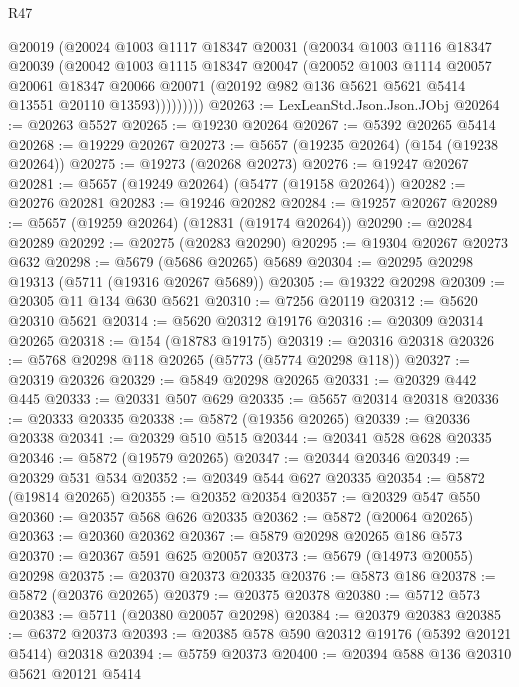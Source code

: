 \begin{lexlean}{R47}
\begin{coremodule}
            @20019
            (@20024
              @1003
              @1117
              @18347
              @20031
              (@20034
                @1003
                @1116
                @18347
                @20039
                (@20042
                  @1003
                  @1115
                  @18347
                  @20047
                  (@20052
                    @1003
                    @1114
                    @20057
                    @20061
                    @18347
                    @20066
                    @20071
                    (@20192 @982 @136 @5621 @5621 @5414 @13551 @20110 @13593)))))))))
@20263 := LexLeanStd.Json.Json.JObj
@20264 := @20263 @5527
@20265 := @19230 @20264
@20267 := @5392 @20265 @5414
@20268 := @19229 @20267
@20273 := @5657 (@19235 @20264) (@154 (@19238 @20264))
@20275 := @19273 (@20268 @20273)
@20276 := @19247 @20267
@20281 := @5657 (@19249 @20264) (@5477 (@19158 @20264))
@20282 := @20276 @20281
@20283 := @19246 @20282
@20284 := @19257 @20267
@20289 := @5657 (@19259 @20264) (@12831 (@19174 @20264))
@20290 := @20284 @20289
@20292 := @20275 (@20283 @20290)
@20295 := @19304 @20267 @20273 @632
@20298 := @5679 (@5686 @20265) @5689
@20304 := @20295 @20298 @19313 (@5711 (@19316 @20267 @5689))
@20305 := @19322 @20298
@20309 := @20305 @11 @134 @630 @5621
@20310 := @7256 @20119
@20312 := @5620 @20310 @5621
@20314 := @5620 @20312 @19176
@20316 := @20309 @20314 @20265
@20318 := @154 (@18783 @19175)
@20319 := @20316 @20318
@20326 := @5768 @20298 @118 @20265 (@5773 (@5774 @20298 @118))
@20327 := @20319 @20326
@20329 := @5849 @20298 @20265
@20331 := @20329 @442 @445
@20333 := @20331 @507 @629
@20335 := @5657 @20314 @20318
@20336 := @20333 @20335
@20338 := @5872 (@19356 @20265)
@20339 := @20336 @20338
@20341 := @20329 @510 @515
@20344 := @20341 @528 @628 @20335
@20346 := @5872 (@19579 @20265)
@20347 := @20344 @20346
@20349 := @20329 @531 @534
@20352 := @20349 @544 @627 @20335
@20354 := @5872 (@19814 @20265)
@20355 := @20352 @20354
@20357 := @20329 @547 @550
@20360 := @20357 @568 @626 @20335
@20362 := @5872 (@20064 @20265)
@20363 := @20360 @20362
@20367 := @5879 @20298 @20265 @186 @573
@20370 := @20367 @591 @625 @20057
@20373 := @5679 (@14973 @20055) @20298
@20375 := @20370 @20373 @20335
@20376 := @5873 @186
@20378 := @5872 (@20376 @20265)
@20379 := @20375 @20378
@20380 := @5712 @573
@20383 := @5711 (@20380 @20057 @20298)
@20384 := @20379 @20383
@20385 := @6372 @20373
@20393 := @20385 @578 @590 @20312 @19176 (@5392 @20121 @5414) @20318
@20394 := @5759 @20373
@20400 := @20394 @588 @136 @20310 @5621 @20121 @5414

\end{coremodule}
\end{lexlean}
